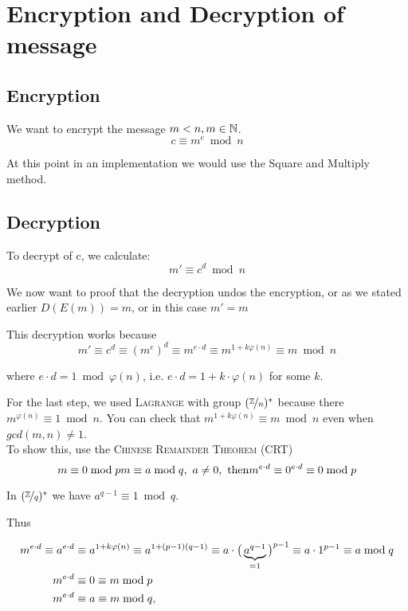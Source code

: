 \section{Encryption and Decryption of message}

\subsection{Encryption}
We want to encrypt the message $m < n, m \in \mathbb{N}$.
\[
c \equiv m^e \bmod n
\]
\begin{remark}
At this point in an implementation we would use the Square and Multiply method.
\end{remark}

\subsection{Decryption}
To decrypt of c, we calculate:
\[
m' \equiv c^d \bmod n
\]
\begin{remark}
We now want to proof that the decryption undos the encryption, or as we stated earlier $D(E(m)) = m$, or in this case $m' = m$
\end{remark}
This decryption works because
\[
m' \equiv c^d \equiv (m^e)^d \equiv m^{e \cdot d} \equiv m^{1+k \varphi(n)} \equiv m \bmod n
\]

where $e \cdot d = 1 \bmod \varphi(n)$, i.e. $e \cdot d = 1 + k \cdot \varphi(n)$ for some $k$. 

For the last step, we used \textsc{Lagrange} with group $(\nicefrac{\mathbb{Z}}{n})^{\ast}$ because there $m^{\varphi(n)} \equiv 1 \bmod n$. You can check that $m^{1+k \varphi(n)} \equiv m \bmod n$ even when $gcd(m,n) \neq 1$. \\

To show this, use the \textsc{Chinese Remainder Theorem (CRT)}
\[ m \equiv 0 \bmod p \\
m \equiv a \bmod q, \,\, a \neq 0, \text{ then} \\
m^{e \cdot d} \equiv 0^{e \cdot d} \equiv 0 \bmod p
\]

In $(\nicefrac{\mathbb{Z}}{q})^{\ast}$ we have $a^{q-1} \equiv 1 \bmod q$.

Thus

\begin{align}
	m^{e \cdot d} \equiv a^{e \cdot d} &\equiv a^{1+k \varphi(n)} \equiv a^{1 + (p-1)(q-1)} \equiv a \cdot \big( \underbrace{a^{q-1}}_{=1}\big)^{p-1} \equiv a \cdot 1^{p-1} \equiv a \bmod q  \notag \\
	m^{e \cdot d} &\equiv 0 \equiv m \bmod p \notag \\
	m^{e \cdot d} &\equiv a \equiv m \bmod q, \notag
\end{align}

